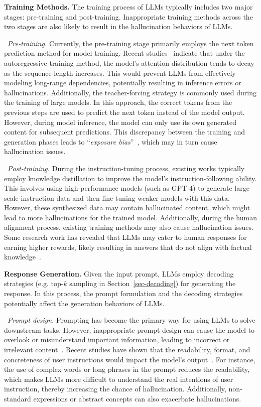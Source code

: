 \textbf{Training Methods.} The training process of LLMs typically includes two major stages: pre-training and post-training. Inappropriate training methods across the two stages are also likely to result in the hallucination behaviors of LLMs. 

\textbullet~\emph{Pre-training.}
Currently, the pre-training stage primarily employs the next token prediction method for model training. {Recent studies~\cite{Liu-arxiv-2023-Lost}} indicate that under the autoregressive training method, the model's attention distribution tends to decay as the sequence length increases. This would prevent LLMs from effectively modeling long-range dependencies, potentially resulting in inference errors or hallucinations. Additionally, the teacher-forcing strategy is commonly used during the training of large models.  In this approach, the correct tokens from the previous steps are used to predict the next token instead of the model output. However, during model inference, the model can only use its own generated content for subsequent predictions. This discrepancy between the training and generation phases leads to ``\emph{exposure bias}''~\cite{Bengio-nips-2015-scheduled}, which may in turn cause hallucination issues.

\textbullet~\emph{Post-training.} 
During the instruction-tuning process, existing works typically employ knowledge distillation to improve the model's instruction-following ability. This involves using high-performance models (such as GPT-4) to generate large-scale instruction data and then fine-tuning weaker models with this data. However, these synthesized data may contain hallucinated content, which might lead to more hallucinations for the trained model. Additionally, during the human alignment process, existing training methods may also cause hallucination issues. Some research work has revealed that LLMs may cater to human responses for earning higher rewards, likely resulting in answers that do not align with factual knowledge~\cite{Sharma-arxiv-2023-towards}.

\textbf{Response Generation.} Given the input prompt, LLMs employ decoding strategies (e.g. top-$k$ sampling in {Section~\ref{sec-decoding}}) for generating the response. In this process, the prompt formulation and the decoding strategies potentially affect the generation behaviors of LLMs. 

\textbullet~\emph{Prompt design.} Prompting has become the primary way for using LLMs to solve downstream tasks. However, inappropriate prompt design can cause the model to overlook or misunderstand important information, leading to incorrect or irrelevant content~\cite{Li-arxiv-2024-dawn}. Recent studies have shown that the readability, format, and concreteness of user instructions would impact the model's output~\cite{Rawte-arxiv-2023-exploring}. For instance, the use of complex words or long phrases in the prompt reduces the readability, which makes LLMs more difficult to understand the real intentions of user instruction, thereby increasing the chance of hallucination. Additionally, non-standard expressions or abstract concepts can also exacerbate hallucinations.


